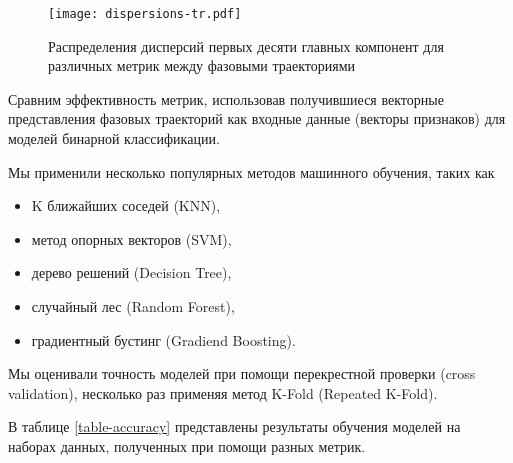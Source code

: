 \begin{figure}[htb]
  \centering
  \texttt{[image: dispersions-tr.pdf]}
  \caption{Распределения дисперсий первых десяти главных компонент для различных метрик между фазовыми траекториями}
  \label{dispersions-tr}
\end{figure}

\begin{table}[h]
  \caption{Энтропия распределения дисперсий главных компонент для различных метрик между траекториями}
  \label{table-disp-tr}
\end{table}

Сравним эффективность метрик, использовав получившиеся векторные представления фазовых траекторий как входные данные (векторы признаков) для моделей бинарной классификации.

Мы применили несколько популярных методов машинного обучения, таких как
\begin{itemize}
  \item K ближайших соседей (KNN),
  \item метод опорных векторов (SVM),
  \item дерево решений (Decision Tree),
  \item случайный лес (Random Forest),
  \item градиентный бустинг (Gradiend Boosting).
\end{itemize}

Мы оценивали точность моделей при помощи перекрестной проверки (cross validation), несколько раз применяя метод K-Fold (Repeated K-Fold).

В таблице \ref{table-accuracy} представлены результаты обучения моделей на наборах данных, полученных при помощи разных метрик.

